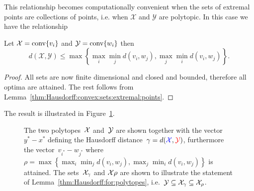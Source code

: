 %
\noindent This relationship becomes computationally convenient when the sets of extremal points are collections of points, i.e. when $\mathcal X$ and $\mathcal Y$ are polytopic. 
%
In this case we have the relationship
%
\begin{thm}\label{thm:Hausdorff:for:polytopes}
Let $\mathcal X = \text{conv}\{v_i\}$ and $\mathcal Y = \text{conv}\{w_i\}$ then
%
\begin{equation}\label{eq:maximal:distance:between:vertices}
	d(\mathcal X,\mathcal Y) \leq \max\left\{\max_i\min_j d(v_i,w_j),\max_j\min_i d(v_i,w_j)\right\}.
\end{equation}
\end{thm}
%
\begin{proof}
All sets are now finite dimensional and closed and bounded, therefore all optima are attained.
%
The rest follows from Lemma~\ref{thm:Hausdorff:convex:sets:extremal:points}.
\end{proof}
%
\noindent The result is illustrated in Figure~\ref{fig:appendix:hausdorff:for:polytopes}.
%
\\[2em]
%
\begin{figure}\centering
{}
\caption[Hausdorff distance for polytopes.]{The two polytopes~\textcolor{blue}{$\mathcal X$} and~\textcolor{red}{$\mathcal Y$} are shown together with the vector~$y^\ast-x^\ast$ defining the Hausdorff distance~$\gamma=d(\textcolor{blue}{\mathcal X},\textcolor{red}{\mathcal Y})$, furthermore the vector~$v_{i^\ast}-w_{j^\ast}$ where $\rho=\max\left\{\max_i\min_j d(v_i,w_j),\max_j\min_i d(v_i,w_j)\right\}$ is attained.
%
The sets~$\mathcal X_\gamma$ and $\mathcal X\rho$ are shown to illustrate the statement of Lemma~\ref{thm:Hausdorff:for:polytopes}, i.e.~$\mathcal Y\subseteq\mathcal X_\gamma\subseteq\mathcal X_\rho$.}
\label{fig:appendix:hausdorff:for:polytopes}
\end{figure}
